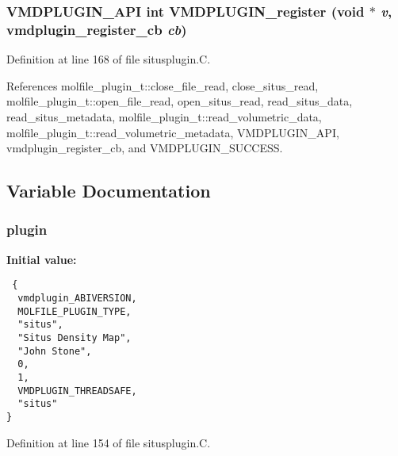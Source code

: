 \subsubsection{\setlength{\rightskip}{0pt plus 5cm}VMDPLUGIN\_\-API int VMDPLUGIN\_\-register (void $\ast$ {\em v}, {\bf vmdplugin\_\-register\_\-cb} {\em cb})}\label{situsplugin_8C_a7}




Definition at line 168 of file situsplugin.C.

References molfile\_\-plugin\_\-t::close\_\-file\_\-read, close\_\-situs\_\-read, molfile\_\-plugin\_\-t::open\_\-file\_\-read, open\_\-situs\_\-read, read\_\-situs\_\-data, read\_\-situs\_\-metadata, molfile\_\-plugin\_\-t::read\_\-volumetric\_\-data, molfile\_\-plugin\_\-t::read\_\-volumetric\_\-metadata, VMDPLUGIN\_\-API, vmdplugin\_\-register\_\-cb, and VMDPLUGIN\_\-SUCCESS.

\subsection{Variable Documentation}
\subsubsection{ plugin\hspace{0.3cm}{\tt  [static]}}\label{situsplugin_8C_a0}


{\bf Initial value:}

\footnotesize\begin{verbatim} {
  vmdplugin_ABIVERSION,   
  MOLFILE_PLUGIN_TYPE,    
  "situs",                
  "Situs Density Map",    
  "John Stone",           
  0,                      
  1,                      
  VMDPLUGIN_THREADSAFE,   
  "situs"                 
}\end{verbatim}\normalsize 


Definition at line 154 of file situsplugin.C.